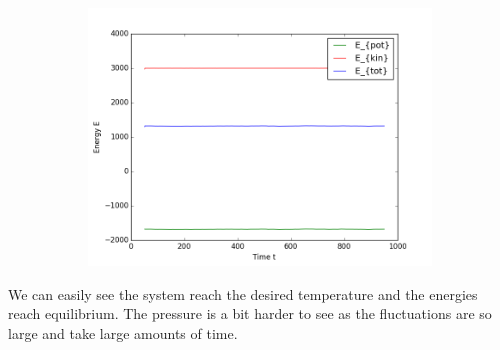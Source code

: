 \begin{figure}[ht]
\begin{subfigure}{0.3\textwidth}
\includegraphics[width=\textwidth]{fig/avEnergies_T2d0_M100.png}
\end{subfigure}
\end{figure}
We can easily see the system reach the desired temperature and the energies reach equilibrium. The pressure is a bit harder to see as the fluctuations are so large and take large amounts of time.


